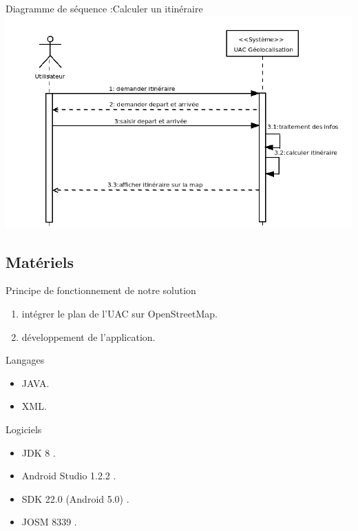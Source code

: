 \documentclass[11pt,handout]{beamer}
\begin{document}
			\begin{frame}
			    \begin{block}{Diagramme de séquence :Calculer un itinéraire}
			      \includegraphics[scale=0.4]{images/sequence_itineraire.png}
			    \end{block}
			\end{frame}
		\subsection{Matériels}
			\begin{frame}
			      \begin{block}{Principe de fonctionnement de notre solution}
				  \begin{enumerate}
				   \item intégrer le plan de l'UAC sur OpenStreetMap.
				   \item développement de l'application.
				  \end{enumerate}
			      \end{block}
			      \begin{block}{Langages}
				  \begin{itemize}
				   \item JAVA.
				   \item XML. 
				  \end{itemize}
			      \end{block}
			      \pause
			      \begin{block}{Logiciels}
				  \begin{itemize}
				   \item JDK 8 .
				   \item Android Studio 1.2.2 .
				   \item SDK 22.0 (Android 5.0) .
				   \item JOSM 8339 .
				  \end{itemize}
			      \end{block}
			\end{frame}
\end{document}
